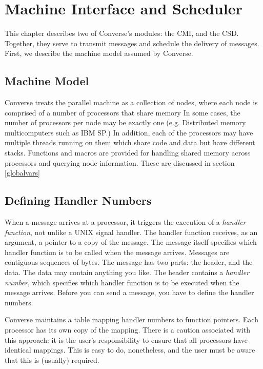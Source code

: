 \chapter{Machine Interface and Scheduler}

This chapter describes two of Converse's modules: the CMI, and the
CSD.  Together, they serve to transmit messages and schedule the
delivery of messages. First, we describe the machine model assumed by
Converse.

\section{Machine Model}
\label{model}

Converse treats the parallel machine as a collection of nodes, where
each node is comprised of a number of processors that share memory 
In some cases, the number of processors per node may be exactly one  
(e.g. Distributed memory multicomputers such as IBM SP.)  
In addition, each of the processors may have multiple threads running on
them which share code and data but have different stacks.
Functions and macros are provided for handling shared memory across
processors and querying node information. These are discussed in section
\ref{globalvars}

\section{Defining Handler Numbers}
\label{handler1}

When a message arrives at a processor, it triggers the execution of a
{\em handler function}, not unlike a UNIX signal handler.  The handler
function receives, as an argument, a pointer to a copy of the message.
The message itself specifies which handler function is to be
called when the message arrives.  Messages are contiguous sequences of
bytes.  The message has two parts: the header, and the data.  The data
may contain anything you like.  The header contains a {\em handler
number}, which specifies which handler function is to be executed when
the message arrives.  Before you can send a message, you have to
define the handler numbers.

Converse maintains a table mapping handler numbers to function
pointers.  Each processor has its own copy of the mapping.  There is a
caution associated with this approach: it is the user's responsibility
to ensure that all processors have identical mappings.  This is easy
to do, nonetheless, and the user must be aware that this is (usually)
required.

